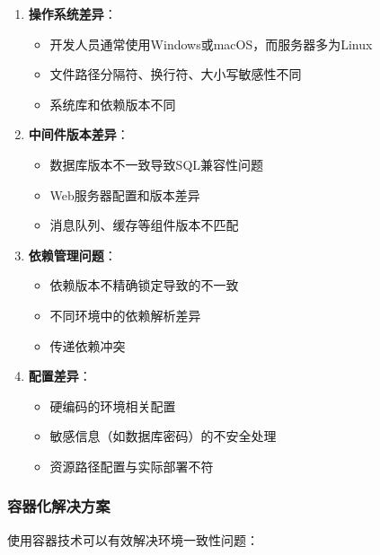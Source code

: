 \begin{enumerate}
\def\labelenumi{\arabic{enumi}.}
\tightlist
\item
  \textbf{操作系统差异}：

  \begin{itemize}
  \tightlist
  \item
    开发人员通常使用Windows或macOS，而服务器多为Linux
  \item
    文件路径分隔符、换行符、大小写敏感性不同
  \item
    系统库和依赖版本不同
  \end{itemize}
\item
  \textbf{中间件版本差异}：

  \begin{itemize}
  \tightlist
  \item
    数据库版本不一致导致SQL兼容性问题
  \item
    Web服务器配置和版本差异
  \item
    消息队列、缓存等组件版本不匹配
  \end{itemize}
\item
  \textbf{依赖管理问题}：

  \begin{itemize}
  \tightlist
  \item
    依赖版本不精确锁定导致的不一致
  \item
    不同环境中的依赖解析差异
  \item
    传递依赖冲突
  \end{itemize}
\item
  \textbf{配置差异}：

  \begin{itemize}
  \tightlist
  \item
    硬编码的环境相关配置
  \item
    敏感信息（如数据库密码）的不安全处理
  \item
    资源路径配置与实际部署不符
  \end{itemize}
\end{enumerate}

\subsubsection{容器化解决方案}\label{ux5bb9ux5668ux5316ux89e3ux51b3ux65b9ux6848}

使用容器技术可以有效解决环境一致性问题：


